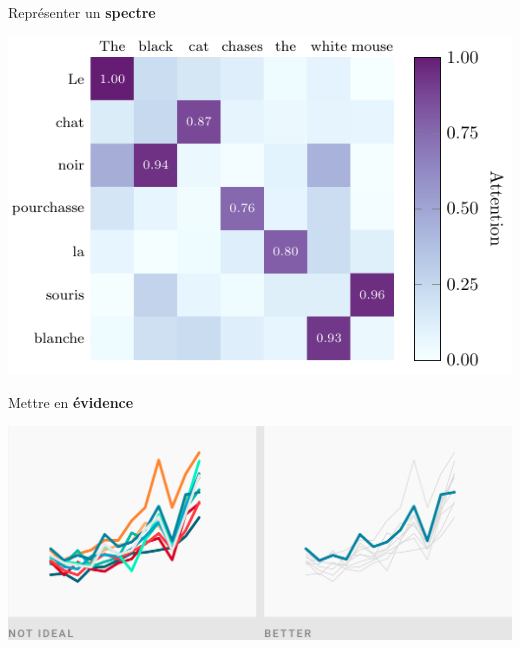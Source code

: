 \documentclass[aspectratio=169]{beamer}
\begin{document}
\begin{frame}[c]
\begin{minipage}[t]{.49\textwidth}
\centering
Représenter un \textbf{spectre}
\vspace*{3mm}

\includegraphics[scale=.35]{examples/heatmap_example.pdf}
\end{minipage}
\begin{minipage}[t]{.49\textwidth}
\centering
Mettre en \textbf{évidence}
\vspace*{3mm}

\includegraphics[width=.9\textwidth, trim={0 4cm 0 0}, clip]{figures/mise-en-evidence.png}
\end{minipage}
\end{frame}
\end{document}
